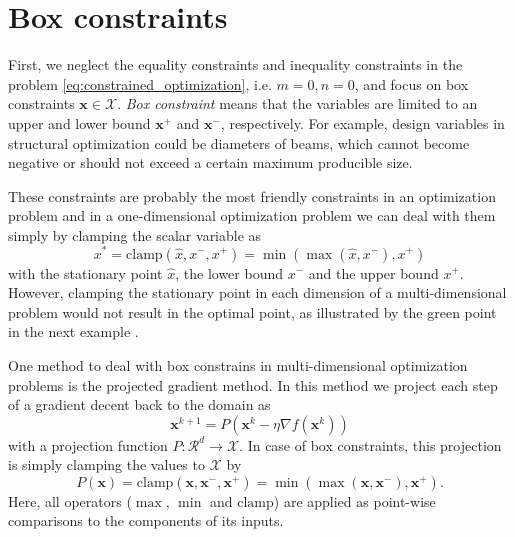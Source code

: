\section{Box constraints} 
First, we neglect the equality constraints and inequality constraints in the problem \eqref{eq:constrained_optimization}, i.e. $m=0, n=0$, and focus on box constraints $\mathbf{x} \in \mathcal{X}$. \emph{Box constraint} means that the variables are limited to an upper and lower bound $\mathbf{x}^+$ and $\mathbf{x}^-$, respectively. For example, design variables in structural optimization could be diameters of beams, which cannot become negative or should not exceed a certain maximum producible size.

These constraints are probably the most friendly constraints in an optimization problem and in a one-dimensional optimization problem we can deal with them simply by clamping the scalar variable as 
\begin{equation}
    x^* = \textrm{clamp}(\hat{x}, x^-, x^+) = \min(\max(\hat{x}, x^-), x^+)
\end{equation}
with the stationary point $\hat{x}$, the lower bound $x^-$ and the upper bound $x^+$. 
However, clamping the stationary point in each dimension of a multi-dimensional problem would not result in the optimal point, as illustrated by the green point in the next example \cite{Niculae2020}.

One method to deal with box constrains in multi-dimensional optimization problems is the projected gradient method. In this method we project each step of a gradient decent back to the domain as 
\begin{equation}
    \mathbf{x}^{k+1} = P(\mathbf{x}^k -\eta \nabla f(\mathbf{x}^k))
\end{equation}
with a projection function $P: \mathcal{R}^d \rightarrow \mathcal{X}$. In case of box constraints, this projection is simply clamping the values to $\mathcal{X}$ by 
\begin{equation}
    P(\mathbf{x}) = \textrm{clamp}(\mathbf{x}, \mathbf{x}^-, \mathbf{x}^+) = \min(\max(\mathbf{x}, \mathbf{x}^-), \mathbf{x}^+).
\end{equation}
Here, all operators ($\max$, $\min$ and $\textrm{clamp}$) are applied as point-wise comparisons to the components of its inputs.

